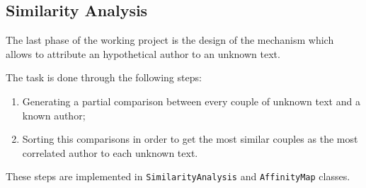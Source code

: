 \documentclass[a4paper,11pt, twoside]{article}
\begin{document}
	
	\subsection{Similarity Analysis}
		\noindent
		The last phase of the working project is the design of the mechanism which allows to attribute an hypothetical author to an unknown text.
		
		\noindent
		The task is done through the following steps: 
		\begin{enumerate}
			\item Generating a partial comparison between every couple of unknown text and a known author;
			\item Sorting this comparisons in order to get the most similar couples as the most correlated author to each unknown text.
		\end{enumerate}

		\noindent
		These steps are implemented in \lstinline|SimilarityAnalysis| and \lstinline|AffinityMap| classes.

		\bigskip
\end{document}
